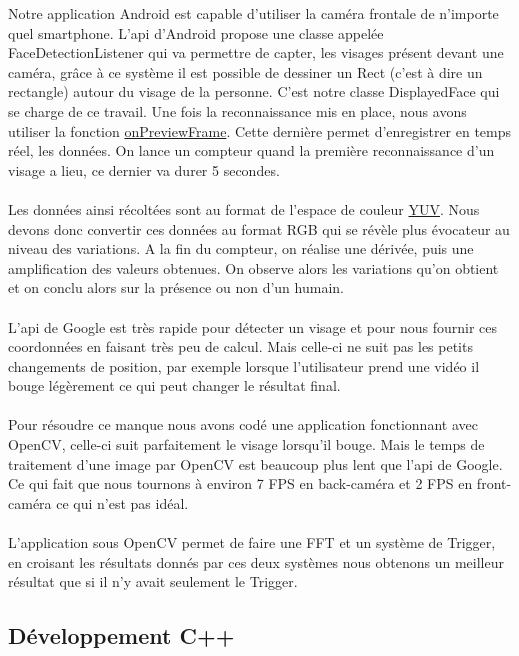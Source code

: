 	Notre application Android est capable d'utiliser la caméra frontale de n'importe quel smartphone. L'api d'Android propose une classe appelée FaceDetectionListener qui va permettre de capter, les visages présent 
	devant une caméra, grâce à ce système il est possible de dessiner un Rect (c'est à dire un rectangle) autour du visage de la personne. C'est notre classe DisplayedFace qui se charge de ce travail. Une fois la 
	reconnaissance mis en place, nous avons utiliser la fonction \href{http://developer.android.com/reference/android/hardware/Camera.PreviewCallback.html#onPreviewFrame\%28byte\%5B\%5D,\%20android.hardware.Camera\%29}{onPreviewFrame}. Cette dernière permet d'enregistrer en temps réel, les données. On lance un compteur quand la première reconnaissance d'un visage a lieu, ce dernier va durer 5 secondes.\\
\\
	Les données ainsi récoltées sont au format de l'espace de couleur \href{http://fr.wikipedia.org/wiki/YUV}{YUV}. Nous devons donc convertir ces données au format RGB qui se révèle plus évocateur au niveau des variations. 
	A la fin du compteur, on réalise une dérivée, puis une amplification des valeurs obtenues. On observe alors les variations qu'on obtient et on conclu alors sur la présence ou non d'un humain.
	\\
	\\
	L'api de Google est très rapide pour détecter un visage et pour nous fournir ces coordonnées en faisant très peu de calcul. Mais celle-ci ne suit pas les petits changements de position, par exemple lorsque l'utilisateur prend une vidéo il bouge légèrement ce qui peut changer le résultat final.
	\\
	\\
	Pour résoudre ce manque nous avons codé une application fonctionnant avec OpenCV, celle-ci suit parfaitement le visage lorsqu'il bouge. Mais le temps de traitement d'une image par OpenCV est beaucoup plus lent que l'api de Google. Ce qui fait que nous tournons à environ 7 FPS en back-caméra et 2 FPS en front-caméra ce qui n'est pas idéal.
	\\
	\\
	L'application sous OpenCV permet de faire une FFT et un système de Trigger, en croisant les résultats donnés par ces deux systèmes nous obtenons un meilleur résultat que si il n'y avait seulement le Trigger.  

\subsection{Développement C++}

